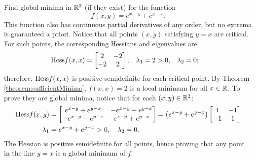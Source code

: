 \begin{example}
Find global minima in $\mathbb{R}^2$ (if they exist) for the function
\begin{equation*}
f(x,y) = e^{x-y} + e^{y-x}.
\end{equation*}
This function also has continuous partial derivatives of any order, but no extrema is guaranteed a priori.  Notice that all points $(x, y)$ satisfying $y = x$ are critical.  For such points, the corresponding Hessians and eigenvalues are
\begin{align*}
\mathop{\mathrm{Hess}{f}}(x,x) &= \begin{bmatrix} 2 & -2 \\ -2 & 2 \end{bmatrix}, & \lambda_1 &= 2 >0, & \lambda_2 &= 0;
\end{align*}
therefore, $\mathop{\mathrm{Hess}{f}}(x,x)$ is positive semidefinite for each critical point.  By Theorem \ref{theorem:sufficientMinima}, $f(x,x) = 2$ is a local minimum for all $x \in \mathbb{R}$.  To prove they are global minima, notice that for each $(x,y) \in \mathbb{R}^2$:
\begin{align*}
\mathop{\mathrm{Hess}{f}}(x,y) &= \begin{bmatrix} e^{x-y}+e^{y-x} & -e^{x-y}-e^{y-x} \\ -e^{x-y} - e^{y-x} & e^{x-y}+e^{y-x} \end{bmatrix} = \big( e^{x-y}+e^{y-x} \big) \begin{bmatrix} 1 & -1 \\ -1 & 1 \end{bmatrix} \\
\lambda_1 &= e^{x-y}+e^{y-x} > 0, \quad \lambda_2 =0.
\end{align*}
The Hessian is positive semidefinite for all points, hence proving that any point in the line $y=x$ is a global minimum of $f$.
\end{example}


